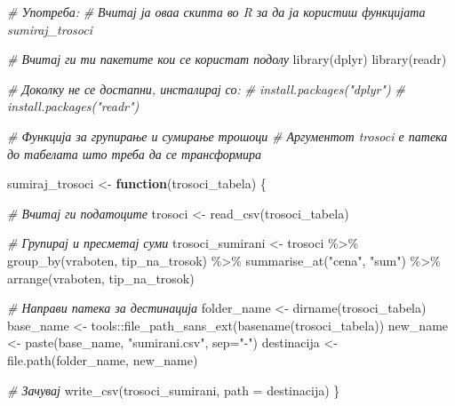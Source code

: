 \documentclass[
]{book}
\newenvironment{Shaded}{\begin{snugshade}}{\end{snugshade}}
\newcommand{\AttributeTok}[1]{\textcolor[rgb]{0.77,0.63,0.00}{#1}}
\newcommand{\CommentTok}[1]{\textcolor[rgb]{0.56,0.35,0.01}{\textit{#1}}}
\newcommand{\ControlFlowTok}[1]{\textcolor[rgb]{0.13,0.29,0.53}{\textbf{#1}}}
\newcommand{\FunctionTok}[1]{\textcolor[rgb]{0.00,0.00,0.00}{#1}}
\newcommand{\NormalTok}[1]{#1}
\newcommand{\OtherTok}[1]{\textcolor[rgb]{0.56,0.35,0.01}{#1}}
\newcommand{\SpecialCharTok}[1]{\textcolor[rgb]{0.00,0.00,0.00}{#1}}
\newcommand{\StringTok}[1]{\textcolor[rgb]{0.31,0.60,0.02}{#1}}
\begin{document}
\begin{Shaded}
\begin{Highlighting}[]
\CommentTok{\# Употреба:}
\CommentTok{\# Вчитај ја оваа скипта во R за да ја користиш функцијата \textasciigrave{}sumiraj\_trosoci\textasciigrave{}  }

\CommentTok{\# Вчитај ги ти пакетите кои се користат подолу }
\FunctionTok{library}\NormalTok{(dplyr)}
\FunctionTok{library}\NormalTok{(readr)}

\CommentTok{\# Доколку не се достапни, инсталирај со:}
\CommentTok{\# install.packages("dplyr")}
\CommentTok{\# install.packages("readr")}

\CommentTok{\# Функција за групирање и сумирање трошоци}
\CommentTok{\# Аргументот \textasciigrave{}trosoci\textasciigrave{} е патека до табелата што треба да се трансформира}

\NormalTok{sumiraj\_trosoci }\OtherTok{\textless{}{-}} \ControlFlowTok{function}\NormalTok{(trosoci\_tabela) \{}
  
  \CommentTok{\# Вчитај ги податоците}
\NormalTok{  trosoci }\OtherTok{\textless{}{-}} \FunctionTok{read\_csv}\NormalTok{(trosoci\_tabela)}
  
  \CommentTok{\# Групирај и пресметај суми}
\NormalTok{  trosoci\_sumirani }\OtherTok{\textless{}{-}}\NormalTok{ trosoci }\SpecialCharTok{\%\textgreater{}\%}
    \FunctionTok{group\_by}\NormalTok{(vraboten, tip\_na\_trosok) }\SpecialCharTok{\%\textgreater{}\%}
    \FunctionTok{summarise\_at}\NormalTok{(}\StringTok{"cena"}\NormalTok{, }\StringTok{"sum"}\NormalTok{) }\SpecialCharTok{\%\textgreater{}\%} 
  \FunctionTok{arrange}\NormalTok{(vraboten, tip\_na\_trosok)}
  
  \CommentTok{\# Направи патека за дестинација}
\NormalTok{  folder\_name }\OtherTok{\textless{}{-}} \FunctionTok{dirname}\NormalTok{(trosoci\_tabela)}
\NormalTok{  base\_name }\OtherTok{\textless{}{-}}\NormalTok{ tools}\SpecialCharTok{::}\FunctionTok{file\_path\_sans\_ext}\NormalTok{(}\FunctionTok{basename}\NormalTok{(trosoci\_tabela))}
\NormalTok{  new\_name }\OtherTok{\textless{}{-}} \FunctionTok{paste}\NormalTok{(base\_name, }\StringTok{"sumirani.csv"}\NormalTok{, }\AttributeTok{sep=}\StringTok{"{-}"}\NormalTok{)}
\NormalTok{  destinacija }\OtherTok{\textless{}{-}} \FunctionTok{file.path}\NormalTok{(folder\_name, new\_name)}
  
  \CommentTok{\# Зачувај}
  \FunctionTok{write\_csv}\NormalTok{(trosoci\_sumirani, }\AttributeTok{path =}\NormalTok{ destinacija)}
\NormalTok{\}}
\end{Highlighting}
\end{Shaded}
\end{document}
